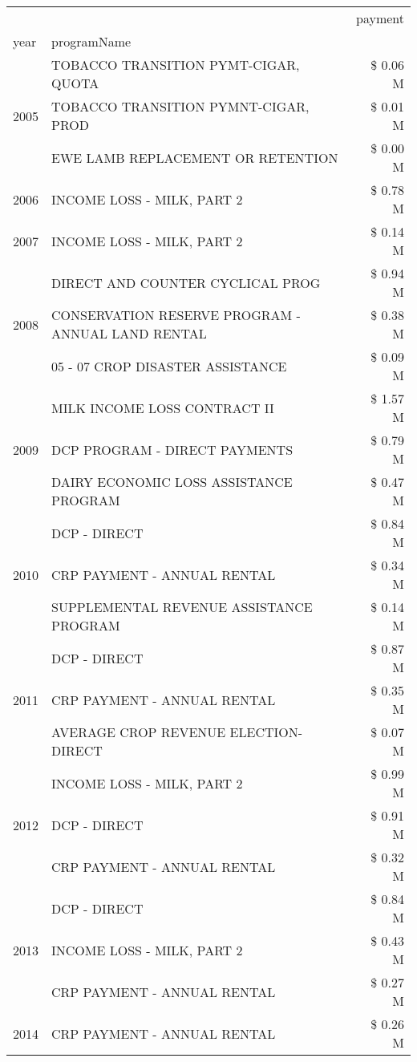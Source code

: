 \begin{tabular}{llr}
\toprule
 &  & payment \\
year & programName &  \\
\midrule
\multirow[t]{3}{*}{2005} & TOBACCO TRANSITION PYMT-CIGAR, QUOTA & \$ 0.06 M \\
 & TOBACCO TRANSITION PYMNT-CIGAR, PROD & \$ 0.01 M \\
 & EWE LAMB REPLACEMENT OR RETENTION & \$ 0.00 M \\
\cline{1-3}
2006 & INCOME LOSS - MILK, PART 2 & \$ 0.78 M \\
\cline{1-3}
2007 & INCOME LOSS - MILK, PART 2 & \$ 0.14 M \\
\cline{1-3}
\multirow[t]{3}{*}{2008} & DIRECT AND COUNTER CYCLICAL PROG & \$ 0.94 M \\
 & CONSERVATION RESERVE PROGRAM - ANNUAL LAND RENTAL & \$ 0.38 M \\
 & 05 - 07 CROP DISASTER ASSISTANCE & \$ 0.09 M \\
\cline{1-3}
\multirow[t]{3}{*}{2009} & MILK INCOME LOSS CONTRACT II & \$ 1.57 M \\
 & DCP PROGRAM - DIRECT PAYMENTS & \$ 0.79 M \\
 & DAIRY ECONOMIC LOSS ASSISTANCE PROGRAM & \$ 0.47 M \\
\cline{1-3}
\multirow[t]{3}{*}{2010} & DCP - DIRECT & \$ 0.84 M \\
 & CRP PAYMENT - ANNUAL RENTAL & \$ 0.34 M \\
 & SUPPLEMENTAL REVENUE ASSISTANCE PROGRAM & \$ 0.14 M \\
\cline{1-3}
\multirow[t]{3}{*}{2011} & DCP - DIRECT & \$ 0.87 M \\
 & CRP PAYMENT - ANNUAL RENTAL & \$ 0.35 M \\
 & AVERAGE CROP REVENUE ELECTION-DIRECT & \$ 0.07 M \\
\cline{1-3}
\multirow[t]{3}{*}{2012} & INCOME LOSS - MILK, PART 2 & \$ 0.99 M \\
 & DCP - DIRECT & \$ 0.91 M \\
 & CRP PAYMENT - ANNUAL RENTAL & \$ 0.32 M \\
\cline{1-3}
\multirow[t]{3}{*}{2013} & DCP - DIRECT & \$ 0.84 M \\
 & INCOME LOSS - MILK, PART 2 & \$ 0.43 M \\
 & CRP PAYMENT - ANNUAL RENTAL & \$ 0.27 M \\
\cline{1-3}
\multirow[t]{3}{*}{2014} & CRP PAYMENT - ANNUAL RENTAL & \$ 0.26 M \\

\end{tabular}
